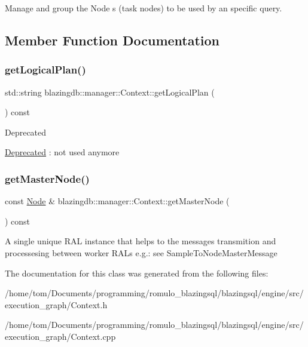 Manage and group the Node \textquotesingle{}s (task nodes) to be used by an specific query. 

\subsection{Member Function Documentation}
\mbox{\label{classblazingdb_1_1manager_1_1Context_ae0093ffa619c372c6130af7e3c77c372}} 
\subsubsection{\texorpdfstring{get\+Logical\+Plan()}{getLogicalPlan()}}
{\footnotesize\ttfamily std\+::string blazingdb\+::manager\+::\+Context\+::get\+Logical\+Plan (\begin{DoxyParamCaption}{ }\end{DoxyParamCaption}) const}

\begin{DoxyRefDesc}{Deprecated}
\item[\hyperlink{deprecated__deprecated000001}{Deprecated}]\+: not used anymore \end{DoxyRefDesc}
\mbox{\label{classblazingdb_1_1manager_1_1Context_ad1faee75fb1b10af373d6481ae621dfd}} 
\subsubsection{\texorpdfstring{get\+Master\+Node()}{getMasterNode()}}
{\footnotesize\ttfamily const \hyperlink{classblazingdb_1_1transport_1_1Node}{Node} \& blazingdb\+::manager\+::\+Context\+::get\+Master\+Node (\begin{DoxyParamCaption}{ }\end{DoxyParamCaption}) const}

A single unique R\+AL instance that helps to the messages transmition and processesing between worker R\+AL\textquotesingle{}s e.\+g.\+: see Sample\+To\+Node\+Master\+Message 

The documentation for this class was generated from the following files\+:\begin{DoxyCompactItemize}
\item 
/home/tom/\+Documents/programming/romulo\+\_\+blazingsql/blazingsql/engine/src/execution\+\_\+graph/Context.\+h\item 
/home/tom/\+Documents/programming/romulo\+\_\+blazingsql/blazingsql/engine/src/execution\+\_\+graph/Context.\+cpp\end{DoxyCompactItemize}
